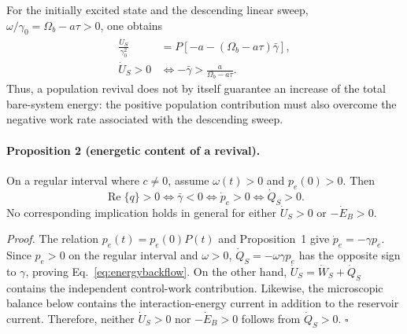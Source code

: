 \documentclass[reprint,superscriptaddress,floatfix,amsmath,amssymb,prresearch,aps]{revtex4-2}
\newcommand{\Ree}{\operatorname{Re}}
\begin{document}
For the initially excited state and the descending linear sweep,
\(\omega/\gamma_0=\Omega_b-a\tau>0\), one obtains
\begin{align}
\frac{\dot U_S}{\gamma_0^2}
&=P\left[-a-(\Omega_b-a\tau)\bar\gamma\right],
\nonumber\\
\dot U_S>0
&\Longleftrightarrow
-\bar\gamma>\frac{a}{\Omega_b-a\tau}.
\label{eq:systemenergyrate}
\end{align}
Thus, a population revival does not by itself guarantee an increase of the
total bare-system energy: the positive population contribution must also
overcome the negative work rate associated with the descending sweep.

\paragraph{Proposition 2 (energetic content of a revival).}
On a regular interval where \(c\neq0\), assume \(\omega(t)>0\) and
\(p_e(0)>0\). Then
\begin{equation}
\Ree\{q\}>0
\Longleftrightarrow \bar\gamma<0
\Longleftrightarrow \dot p_e>0
\Longleftrightarrow \dot Q_S>0.
\label{eq:energybackflow}
\end{equation}
No corresponding implication holds in general for either \(\dot U_S>0\) or
\(-\dot E_B>0\).

\textit{Proof.}
The relation \(p_e(t)=p_e(0)P(t)\) and Proposition~1 give
\(\dot p_e=-\gamma p_e\). Since \(p_e>0\) on the regular interval and
\(\omega>0\), \(\dot Q_S=-\omega\gamma p_e\) has the opposite sign to
\(\gamma\), proving Eq.~\eqref{eq:energybackflow}. On the other hand,
\(\dot U_S=\dot W_S+\dot Q_S\) contains the independent control-work
contribution. Likewise, the microscopic balance below contains the
interaction-energy current in addition to the reservoir current. Therefore,
neither \(\dot U_S>0\) nor \(-\dot E_B>0\) follows from \(\dot Q_S>0\).
\hfill\(\square\)
\end{document}
